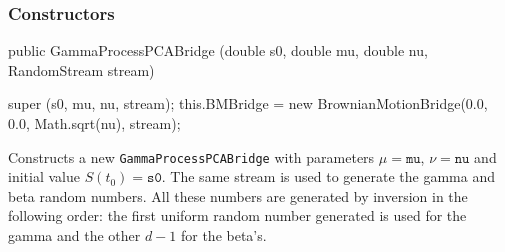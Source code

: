 \subsubsection* {Constructors}
\begin{code}

   public GammaProcessPCABridge (double s0, double mu, double nu, 
                                 RandomStream stream)\begin{hide} {
        super (s0, mu, nu,  stream);
        this.BMBridge = new BrownianMotionBridge(0.0, 0.0, Math.sqrt(nu), stream);
    }\end{hide}
\end{code}
\begin{tabb} Constructs a new \texttt{GammaProcessPCABridge} with parameters
$\mu = \texttt{mu}$, $\nu = \texttt{nu}$ and initial value $S(t_{0}) = \texttt{s0}$.
The same stream is used to generate the gamma and beta random numbers.  All
these numbers are generated by inversion in the following order:
the first uniform random number generated
is used for the gamma and the other $d-1$ for the beta's.

\end{tabb}

